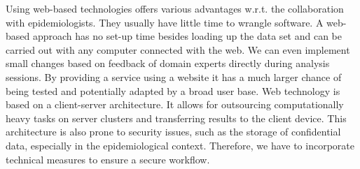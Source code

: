 \documentclass[journal]{style/vgtc} 			          %
\begin{document}
Using web-based technologies offers various advantages w.r.t. the collaboration with epidemiologists.
They usually have little time to wrangle software.
A web-based approach has no set-up time besides loading up the data set and can be carried out with any computer connected with the web.
We can even implement small changes based on feedback of domain experts directly during analysis sessions. %
By providing a service using a website it has a much larger chance of being tested and potentially adapted by a broad user base.
Web technology is based on a client-server architecture.
It allows for outsourcing computationally heavy tasks on server clusters and transferring results to the client device.
This architecture is also prone to security issues, such as the storage of confidential data, especially in the epidemiological context.
Therefore, we have to incorporate technical measures to ensure a secure workflow.
\end{document}

